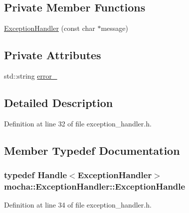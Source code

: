 \subsection*{Private Member Functions}
\begin{DoxyCompactItemize}
\item 
\hyperlink{classmocha_1_1_exception_handler_a8188d53fba437ba3711f5e161eba4e9f}{ExceptionHandler} (const char $\ast$message)
\end{DoxyCompactItemize}
\subsection*{Private Attributes}
\begin{DoxyCompactItemize}
\item 
std::string \hyperlink{classmocha_1_1_exception_handler_a0a0a95700abd61de8ed3e19a32219d3d}{error\_\-}
\end{DoxyCompactItemize}


\subsection{Detailed Description}


Definition at line 32 of file exception\_\-handler.h.



\subsection{Member Typedef Documentation}
\hypertarget{classmocha_1_1_exception_handler_a438ecf67fc82c3eb61b570767795151f}{
\subsubsection[{ExceptionHandle}]{\setlength{\rightskip}{0pt plus 5cm}typedef {\bf Handle}$<${\bf ExceptionHandler}$>$ {\bf mocha::ExceptionHandler::ExceptionHandle}}}
\label{classmocha_1_1_exception_handler_a438ecf67fc82c3eb61b570767795151f}


Definition at line 34 of file exception\_\-handler.h.



